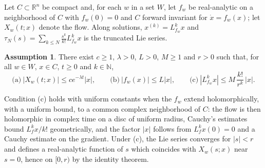 \documentclass[preprint,12pt,authoryear]{elsarticle}
\theoremstyle{definition}
\newtheorem{assumption}{Assumption}
\theoremstyle{remark}
\newcommand{\R}{\mathbb{R}}
\newcommand{\N}{\mathbb{N}}
\begin{document}
Let $C\subset\R^n$ be compact and, for each $w$ in a set $W$, let $f_w$ be real-analytic on a neighborhood of $C$ with $f_w(0)=0$ and $C$ forward invariant for $\dot x=f_w(x)$; let $X_w(t;x)$ denote the flow. Along solutions, $x^{(k)}=L_{f_w}^kx$ and $\tau_N(s)=\sum_{k\le N}\frac{s^k}{k!}L_{f_w}^kx$ is the truncated Lie series.
\begin{assumption}\label{ass:NL}
There exist $c\ge1$, $\lambda>0$, $L>0$, $M\ge1$ and $r>0$ such that, for all $w\in W$, $x\in C$, $t\ge0$ and $k\in\N$,
\begin{equation}\label{eq:assNL}
\text{(a)}\ |X_w(t;x)|\le ce^{-\lambda t}|x|,\qquad\text{(b)}\ |f_w(x)|\le L|x|,\qquad\text{(c)}\ |L_{f_w}^kx|\le M\,\frac{k!}{r^k}\,|x| .
\end{equation}
\end{assumption}
Condition (c) holds with uniform constants when the $f_w$ extend holomorphically, with a uniform bound, to a common complex neighborhood of $C$: the flow is then holomorphic in complex time on a disc of uniform radius, Cauchy's estimates bound $L_f^kx/k!$ geometrically, and the factor $|x|$ follows from $L_f^kx(0)=0$ and a Cauchy estimate on the gradient. Under (c), the Lie series converges for $|s|<r$ and defines a real-analytic function of $s$ which coincides with $X_w(s;x)$ near $s=0$, hence on $[0,r)$ by the identity theorem.
\end{document}
